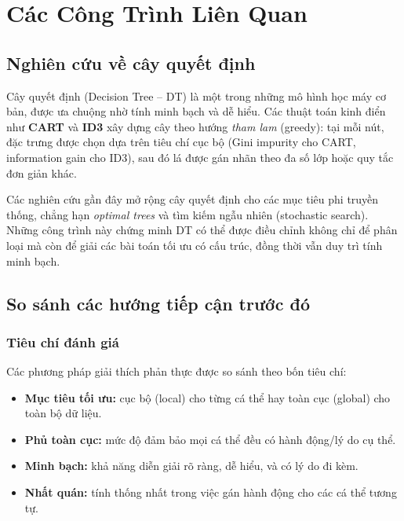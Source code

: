 \chapter{Các Công Trình Liên Quan}

\section{Nghiên cứu về cây quyết định}
Cây quyết định (Decision Tree – DT) là một trong những mô hình học máy cơ bản, được ưa chuộng nhờ tính minh bạch và dễ hiểu. Các thuật toán kinh điển như \textbf{CART} \parencite{breiman1984cart} và \textbf{ID3} \parencite{quinlan1986induction} xây dựng cây theo hướng \emph{tham lam} (greedy): tại mỗi nút, đặc trưng được chọn dựa trên tiêu chí cục bộ (Gini impurity cho CART, information gain cho ID3), sau đó lá được gán nhãn theo đa số lớp hoặc quy tắc đơn giản khác.

Các nghiên cứu gần đây mở rộng cây quyết định cho các mục tiêu phi truyền thống, chẳng hạn \emph{optimal trees} \parencite{hu2019optimal, aglin2020learning} và tìm kiếm ngẫu nhiên (stochastic search). Những công trình này chứng minh DT có thể được điều chỉnh không chỉ để phân loại mà còn để giải các bài toán tối ưu có cấu trúc, đồng thời vẫn duy trì tính minh bạch.

\section{So sánh các hướng tiếp cận trước đó}

\subsection{Tiêu chí đánh giá}
Các phương pháp giải thích phản thực được so sánh theo bốn tiêu chí:

\begin{itemize}
\item \textbf{Mục tiêu tối ưu:} cục bộ (local) cho từng cá thể hay toàn cục (global) cho toàn bộ dữ liệu.
\item \textbf{Phủ toàn cục:} mức độ đảm bảo mọi cá thể đều có hành động/lý do cụ thể.
\item \textbf{Minh bạch:} khả năng diễn giải rõ ràng, dễ hiểu, và có lý do đi kèm.
\item \textbf{Nhất quán:} tính thống nhất trong việc gán hành động cho các cá thể tương tự.
\end{itemize}

